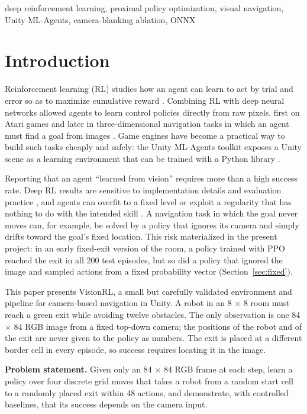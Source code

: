 \documentclass[conference]{IEEEtran}
\begin{document}
\begin{IEEEkeywords}
deep reinforcement learning, proximal policy optimization, visual navigation, Unity ML-Agents, camera-blanking ablation, ONNX
\end{IEEEkeywords}


\section{Introduction}
Reinforcement learning (RL) studies how an agent can learn to act by trial and error so as to maximize cumulative reward \cite{sutton2018}. Combining RL with deep neural networks allowed agents to learn control policies directly from raw pixels, first on Atari games \cite{mnih2013atari,mnih2015dqn} and later in three-dimensional navigation tasks in which an agent must find a goal from images \cite{zhu2017target,mirowski2017navigate}. Game engines have become a practical way to build such tasks cheaply and safely: the Unity ML-Agents toolkit exposes a Unity scene as a learning environment that can be trained with a Python library \cite{juliani2018unity,mlagents_repo}.

Reporting that an agent ``learned from vision'' requires more than a high success rate. Deep RL results are sensitive to implementation details and evaluation practice \cite{henderson2018matters,engstrom2020implementation}, and agents can overfit to a fixed level or exploit a regularity that has nothing to do with the intended skill \cite{cobbe2019quantifying}. A navigation task in which the goal never moves can, for example, be solved by a policy that ignores its camera and simply drifts toward the goal's fixed location. This risk materialized in the present project: in an early fixed-exit version of the room, a policy trained with PPO reached the exit in all 200 test episodes, but so did a policy that ignored the image and sampled actions from a fixed probability vector (Section~\ref{sec:fixed}).

This paper presents VisionRL, a small but carefully validated environment and pipeline for camera-based navigation in Unity. A robot in an 8 $\times$ 8 room must reach a green exit while avoiding twelve obstacles. The only observation is one 84 $\times$ 84 RGB image from a fixed top-down camera; the positions of the robot and of the exit are never given to the policy as numbers. The exit is placed at a different border cell in every episode, so success requires locating it in the image.

\textbf{Problem statement.} Given only an 84 $\times$ 84 RGB frame at each step, learn a policy over four discrete grid moves that takes a robot from a random start cell to a randomly placed exit within 48 actions, and demonstrate, with controlled baselines, that its success depends on the camera input.
\end{document}
